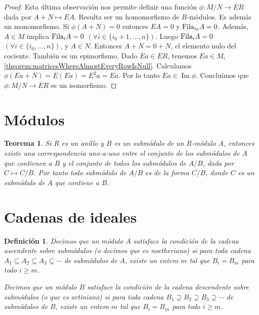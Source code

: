 \documentclass{report}
\newcommand{\Fila}{\textnormal{Fila}}
\DeclareMathOperator{\image}{\text{Im}}
\newtheorem{theorem}{Teorema}
\newtheorem{definition}{Definición}
\begin{document}
\begin{proof}
    Esta última observación nos permite definir una función \(\phi : M / N \rightarrow E R\) dada por \(A + N \mapsto E A\).
    Resulta ser un homomorfismo de \(R\)-módulos.
    Es además un monomorfismo.
    Si \(\phi(A + N) = 0\) entonces \(E A = 0\) y \(\Fila_{i_0} A = 0\).
    Además, \(A \in M\) implica \(\Fila_i A = 0\) \((\forall i \in \{i_0 + 1, \dots, n\})\).
    Luego \(\Fila_i A = 0\) \((\forall i \in \{i_0, \dots, n\})\), y \(A \in N\).
    Entonces \(A + N = 0 + N\), el elemento nulo del cociente.
    También es un epimorfismo.
    Dado \(E a \in E R\), tenemos \(E a \in M_i\) \ref{theorem:matricesWhereAlmostEveryRowIsNull}.
    Calculamos \(\phi(E a + N) = E (E a) = E^2 a = E a\).
    Por lo tanto \(E a \in \image \phi\).
    Concluímos que \(\phi : M / N \rightarrow E R\) es un isomorfismo.
  \end{proof}

  \section{Módulos}
  \begin{theorem}\label{theorem:submodulesOfQuotientModule}
    Si \(R\) es un anillo y \(B\) es un submódulo de un \(R\)-módulo \(A\), entonces existe una correspondencia uno-a-uno entre el conjunto de los submódulos de \(A\) que contienen a \(B\) y el conjunto de todos los submódulos de \(A / B\), dada por \(C \mapsto C / B\).
    Por tanto todo submódulo de \(A / B\) es de la forma \(C / B\), donde \(C\) es un submódulo de \(A\) que contiene a \(B\).
  \end{theorem}


  \section{Cadenas de ideales}

  \begin{definition}
    Decimos que un módulo \(A\) satisface la \emph{condición de la cadena ascendente sobre submódulos} (o decimos que es \emph{noetheriano}) si para toda cadena \(A_1 \subseteq A_2 \subseteq A_3 \subseteq \cdots\) de submódulos de \(A\), existe un entero \(m\) tal que \(B_i = B_m\) para todo \(i \geq m\).

    Decimos que un módulo \(B\) satisface la \emph{condición de la cadena descendente sobre submódulos} (o que es \emph{artiniano}) si para toda cadena \(B_1 \supseteq B_2 \supseteq B_3 \supseteq \cdots\) de submódulos de \(B\), existe un entero \(m\) tal que \(B_i = B_m\) para todo \(i \geq m\).
  \end{definition}
\end{document}
